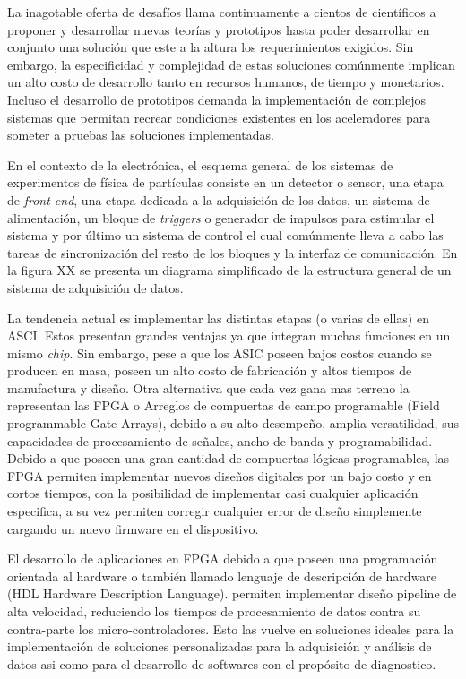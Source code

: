 La inagotable oferta de desafíos llama continuamente a  cientos de científicos a proponer y desarrollar nuevas teorías y prototipos hasta poder desarrollar en conjunto una solución que este a la altura los requerimientos exigidos. Sin embargo, la especificidad y complejidad de estas soluciones comúnmente implican un alto costo de desarrollo tanto en recursos humanos, de tiempo y  monetarios. 
Incluso el desarrollo de prototipos demanda la implementación de complejos sistemas que permitan recrear condiciones existentes en los aceleradores para someter a pruebas las soluciones implementadas.

En el contexto de la electrónica, el esquema general de los sistemas de experimentos de física de partículas consiste en un detector o sensor, una etapa de \textit{front-end}, una etapa dedicada a la adquisición de los datos, un sistema de alimentación, un bloque de \textit{triggers} o generador de impulsos para estimular el sistema y por último un sistema de control el cual comúnmente lleva a cabo las tareas de sincronización del resto de los bloques y la interfaz de comunicación. En la figura XX se presenta un diagrama simplificado de la estructura general de un sistema de adquisición de datos.

	La tendencia actual es implementar las distintas etapas (o varias de ellas) en ASCI. Estos presentan grandes ventajas ya que integran muchas funciones en un mismo \textit{chip}. Sin embargo, pese a que los ASIC poseen bajos costos cuando se producen en masa, poseen un alto costo de fabricación y altos tiempos de manufactura y diseño. Otra alternativa que cada vez gana mas terreno la representan las FPGA o  Arreglos de compuertas de campo programable (Field programmable Gate Arrays), debido a su alto desempeño, amplia versatilidad, sus capacidades de procesamiento de señales, ancho de banda y programabilidad. Debido a que poseen una gran cantidad de  compuertas lógicas programables, las FPGA permiten implementar nuevos diseños digitales por un bajo costo y en cortos tiempos, con la posibilidad de implementar casi cualquier aplicación especifica, a su vez permiten corregir cualquier error de diseño simplemente cargando un nuevo firmware en el dispositivo. 
	
El desarrollo de aplicaciones en FPGA debido a que poseen una programación orientada al hardware o también llamado lenguaje de descripción de hardware (HDL Hardware Description Language). permiten implementar diseño pipeline de alta velocidad, reduciendo los tiempos de procesamiento de datos contra su contra-parte los micro-controladores. Esto las vuelve en soluciones ideales para la implementación  de soluciones personalizadas para la adquisición y  análisis  de datos asi como para el desarrollo de softwares con el propósito de diagnostico.


